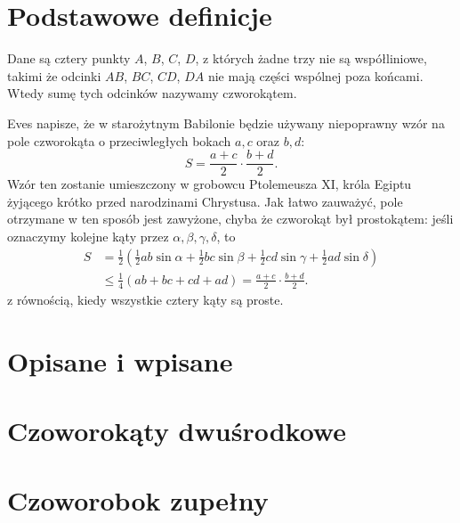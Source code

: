 %

\section{Podstawowe definicje}

\begin{definition}[czworokąt]
%
	Dane są cztery punkty $A$, $B$, $C$, $D$, z których żadne trzy nie są współliniowe, takimi że odcinki $AB$, $BC$, $CD$, $DA$ nie mają części wspólnej poza końcami.
    Wtedy sumę tych odcinków nazywamy czworokątem.	
\end{definition}



Eves \cite[s.4]{eves_1963} napisze, że w starożytnym Babilonie będzie używany niepoprawny wzór na pole czworokąta o przeciwległych bokach $a, c$ oraz $b, d$:
\begin{equation}
	S = \frac{a + c}{2} \cdot \frac{b + d}{2}.
\end{equation}
Wzór ten zostanie umieszczony w grobowcu Ptolemeusza XI, króla Egiptu żyjącego krótko przed narodzinami Chrystusa.
Jak łatwo zauważyć, pole otrzymane w ten sposób jest zawyżone, chyba że czworokąt był prostokątem: jeśli oznaczymy kolejne kąty przez $\alpha, \beta, \gamma, \delta$, to 
\begin{align}
	S & = \frac 1 2 \left(\frac 1 2 ab \sin \alpha + \frac 1 2 bc \sin \beta + \frac 1 2 cd \sin \gamma + \frac 1 2 ad \sin \delta\right) \\
	& \le \frac 1 4 (ab + bc + cd + ad) = \frac{a + c}{2} \cdot \frac{b + d}{2}.
\end{align}
z równością, kiedy wszystkie cztery kąty są proste.

\section{Opisane i wpisane}


\section{Czoworokąty dwuśrodkowe}


%
%
\section{Czoworobok zupełny}

%

